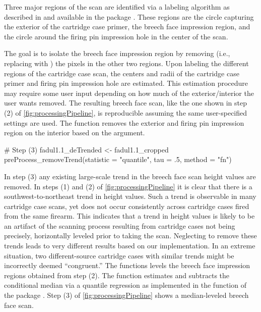 Three major regions of the scan are identified via a labeling algorithm
as described in \citet{hesselink_concurrent_2001} and available in the
 package \citep{imager}. These regions are the circle
capturing the exterior of the cartridge case primer, the breech face
impression region, and the circle around the firing pin impression hole
in the center of the scan.

The goal is to isolate the breech face impression region by removing
(i.e., replacing with ) the pixels in the other two regions.
Upon labeling the different regions of the cartridge case scan, the
centers and radii of the cartridge case primer and firing pin impression
hole are estimated. This estimation procedure may require some user
input depending on how much of the exterior/interior the user wants
removed. The resulting breech face scan, like the one shown in step (2)
of \autoref{fig:processingPipeline}, is reproducible assuming the same
user-specified settings are used. The  function
removes the exterior and firing pin impression region on the interior
based on the  argument.

\begin{Schunk}
\begin{Sinput}
# Step (3)
fadul1.1_deTrended <- fadul1.1_cropped %
  preProcess_removeTrend(statistic = "quantile", tau = .5, method = "fn")
\end{Sinput}
\end{Schunk}

In step (3) any existing large-scale trend in the breech face scan
height values are removed. In steps (1) and (2) of
\autoref{fig:processingPipeline} it is clear that there is a
southwest-to-northeast trend in height values. Such a trend is
observable in many cartridge case scans, yet does not occur consistently
across cartridge cases fired from the same firearm. This indicates that
a trend in height values is likely to be an artifact of the scanning
process resulting from cartridge cases not being precisely, horizontally
leveled prior to taking the scan. Neglecting to remove these trends
leads to very different results based on our implementation. In an
extreme situation, two different-source cartridge cases with similar
trends might be incorrectly deemed ``congruent.'' The
 functions levels the breech face
impression regions obtained from step (2). The function estimates and
subtracts the conditional median via a quantile regression as
implemented in the  function of the  package
\citep{quantreg}. Step (3) of \autoref{fig:processingPipeline} shows a
median-leveled breech face scan.

